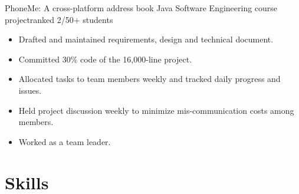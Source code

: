 \documentclass[11pt,a4paper]{moderncv/moderncv}
\begin{document}
{PhoneMe: A cross-platform address book}
{Java}
{Software Engineering course project}{ranked 2/50+ students}
{
\begin{itemize}
	\item Drafted and maintained requirements, design and technical document.
	\item Committed 30\% code of the 16,000-line project.
	\item Allocated tasks to team members weekly and tracked daily progress and issues.
	\item Held project discussion weekly to minimize mis-communication costs among members.
	\item Worked as a team leader.
\end{itemize}
}






\nocite{*}


\section{Skills}
\end{document}
